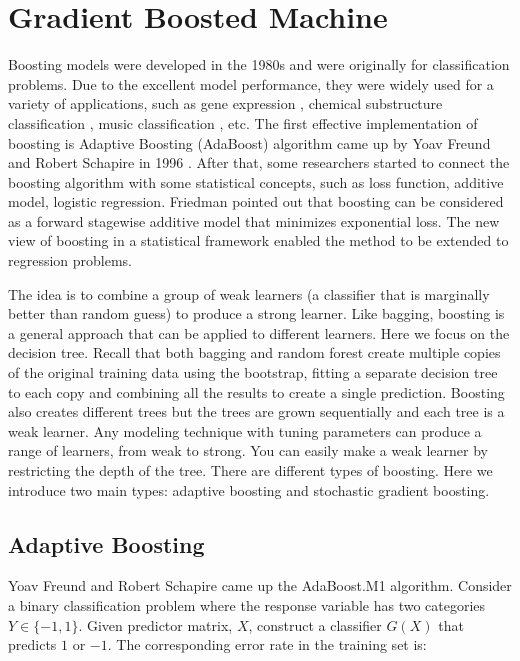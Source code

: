 \documentclass[12pt,]{krantz}
\begin{document}
\hypertarget{gradient-boosted-machine}{%
\section{Gradient Boosted Machine}\label{gradient-boosted-machine}}

Boosting models were developed in the 1980s \citep{Valiant1984, KV1989} and were originally for classification problems. Due to the excellent model performance, they were widely used for a variety of applications, such as gene expression \citep{dudoit2002, bendor2000}, chemical substructure classification \citep{Varmuza2003}, music classification \citep{Bergstra2006}, etc. The first effective implementation of boosting is Adaptive Boosting (AdaBoost) algorithm came up by Yoav Freund and Robert Schapire in 1996 \citep{Schapire1999}. After that, some researchers \citep{Friedman2000} started to connect the boosting algorithm with some statistical concepts, such as loss function, additive model, logistic regression. Friedman pointed out that boosting can be considered as a forward stagewise additive model that minimizes exponential loss. The new view of boosting in a statistical framework enabled the method to be extended to regression problems.

The idea is to combine a group of weak learners (a classifier that is marginally better than random guess) to produce a strong learner. Like bagging, boosting is a general approach that can be applied to different learners. Here we focus on the decision tree. Recall that both bagging and random forest create multiple copies of the original training data using the bootstrap, fitting a separate decision tree to each copy and combining all the results to create a single prediction. Boosting also creates different trees but the trees are grown sequentially and each tree is a weak learner. Any modeling technique with tuning parameters can produce a range of learners, from weak to strong. You can easily make a weak learner by restricting the depth of the tree. There are different types of boosting. Here we introduce two main types: adaptive boosting and stochastic gradient boosting.

\hypertarget{adaptive-boosting}{%
\subsection{Adaptive Boosting}\label{adaptive-boosting}}

Yoav Freund and Robert Schapire \citep{Freund1997} came up the AdaBoost.M1 algorithm. Consider a binary classification problem where the response variable has two categories \(Y \in \{-1, 1\}\). Given predictor matrix, \(X\), construct a classifier \(G(X)\) that predicts \(1\) or \(-1\). The corresponding error rate in the training set is:
\end{document}
